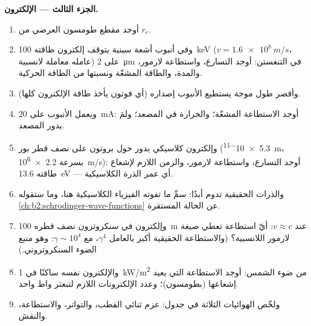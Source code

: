 \begin{problem}
\medskip
\noindent\textbf{الجزء الثالث --- الإلكترون.}
\begin{enumerate}[resume]
  \item أوجد مقطع طومسون العرضي من $r_e$.
  \item وفي أنبوب أشعة سينية يتوقف إلكترون طاقته \qty{100}{keV} ($v = \qty{1.6e8}{m/s}$،
        عامله معاملة لانسبية) على \qty{2}{\micro m} في
        التنغستن: أوجد التسارع، واستطاعة لارمور، والمدة، والطاقة
        المشعّة ونسبتها من الطاقة الحركية.
  \item وأقصر طول موجة يستطيع الأنبوب إصداره (أي فوتون يأخذ
        طاقة الإلكترون كلها).
  \item ويعمل الأنبوب على \qty{20}{mA}: أوجد الاستطاعة المشعّة؛ والحرارة في المصعد؛
        ولمَ يدور المصعد.
  \item وإلكترون كلاسيكي يدور حول بروتون على نصف قطر بور
        (\qty{5.3e-11}{m}، بسرعة \qty{2.2e6}{m/s}): أوجد التسارع، واستطاعة
        لارمور، والزمن اللازم لإشعاع طاقته \qty{13.6}{eV} --- أي
        عمر الذرة الكلاسيكية.
  \item والذرات الحقيقية تدوم أبدًا: سمِّ ما تفوته الفيزياء الكلاسيكية
        هنا، وما ستقوله \cref{ch:b2:schrodinger-wave-functions}
        عن الحالة المستقرة.
  \item وإلكترون في سنكروترون نصف قطره \qty{100}{m} عند $v \approx c$:
        أيّ استطاعة تعطي صيغة لارمور اللانسبية؟ (والاستطاعة
        الحقيقية أكبر بالعامل $\gamma^4$، مع $\gamma \sim 10^4$: وهو
        منبع الضوء السنكروتروني.)
  \item والإلكترون نفسه ساكنًا في \qty{1}{kW/m^2} من ضوء الشمس:
        أوجد الاستطاعة التي يعيد إشعاعها (بطومسون)؛ وعدد الإلكترونات
        اللازم لتبعثر واط واحد.
  \item ولخّص الهوائيات الثلاثة في جدول: عزم ثنائي القطب،
        والتواتر، والاستطاعة، والنقش.
\end{enumerate}
\end{problem}
